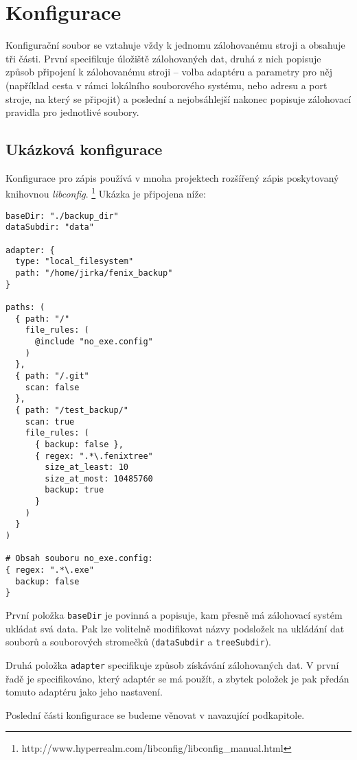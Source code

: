\section{Konfigurace}

Konfigurační soubor se vztahuje vždy k jednomu zálohovanému stroji a obsahuje
tři části. První specifikuje úložiště zálohovaných dat, druhá z nich popisuje
způsob připojení k zálohovanému stroji -- volba adaptéru a parametry pro něj
(například cesta v rámci lokálního souborového systému, nebo adresu a port
stroje, na který se připojit) a poslední a nejobsáhlejší nakonec popisuje
zálohovací pravidla pro jednotlivé soubory.

\subsection*{Ukázková konfigurace}

Konfigurace pro zápis používá v mnoha projektech rozšířený zápis poskytovaný
knihovnou {\it libconfig}.%
\footnote{http://www.hyperrealm.com/libconfig/libconfig\_manual.html}
Ukázka je připojena níže:

\begin{verbatim}
baseDir: "./backup_dir"
dataSubdir: "data"

adapter: {
  type: "local_filesystem"
  path: "/home/jirka/fenix_backup"
}

paths: (
  { path: "/"
    file_rules: (
      @include "no_exe.config"
    )
  },
  { path: "/.git"
    scan: false
  },
  { path: "/test_backup/"
    scan: true
    file_rules: (
      { backup: false },
      { regex: ".*\.fenixtree"
        size_at_least: 10
        size_at_most: 10485760
        backup: true
      }
    )
  }
)

# Obsah souboru no_exe.config:
{ regex: ".*\.exe"
  backup: false
}
\end{verbatim}

První položka \texttt{baseDir} je povinná a popisuje, kam přesně má zálohovací
systém ukládat svá data. Pak lze volitelně modifikovat názvy podsložek na
ukládání dat souborů a souborových stromečků (\texttt{dataSubdir}
a \texttt{treeSubdir}).

Druhá položka \texttt{adapter} specifikuje způsob získávání zálohovaných dat.
V první řadě je specifikováno, který adaptér se má použít, a zbytek položek je
pak předán tomuto adaptéru jako jeho nastavení.

Poslední části konfigurace se budeme věnovat v navazující podkapitole.

